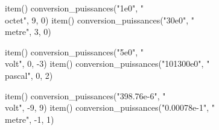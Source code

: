 \documentclass[../Cours.tex]{subfiles}
\begin{document}
\color{bleu}

\begin{listedexemples}
    \small
    \item[] 
    \begin{luacode}
        item() conversion_puissances("1e0", "\\octet", 9, 0)
        item() conversion_puissances("30e0", "\\metre", 3, 0)
    \end{luacode}
    \clearpage
    \item[] 
    \begin{luacode}
        item() conversion_puissances("5e0", "\\volt", 0, -3)
        item() conversion_puissances("101300e0", "\\pascal", 0, 2)
    \end{luacode}
    \item[] 
    \begin{luacode}
        item() conversion_puissances("398.76e-6", "\\volt", -9, 9)
        item() conversion_puissances("0.00078e-1", "\\metre", -1, 1)
    \end{luacode}
\end{listedexemples}

\clearpage
{}

\end{document}
